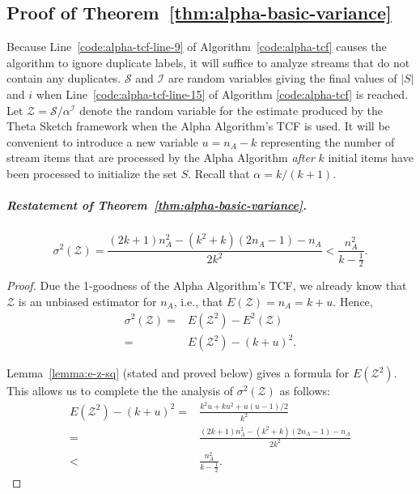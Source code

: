 \documentclass{article}
\begin{document}
\subsection{Proof of Theorem~\ref{thm:alpha-basic-variance}}\label{appendix-proof-of-alpha-basic-variance}



 Because Line~\ref{code:alpha-tcf-line-9} 
of Algorithm~\ref{code:alpha-tcf} causes the algorithm to ignore duplicate labels,
it will suffice to analyze streams that do not contain any duplicates.
$\mathcal{S}$ and $\mathcal{I}$ are random variables giving
the final values of $|S|$ and $i$ when Line~\ref{code:alpha-tcf-line-15} of Algorithm
\ref{code:alpha-tcf} is
reached. Let $\mathcal{Z} = \mathcal{S} / \alpha^{\mathcal{I}}$ denote the
random variable for the estimate produced by the Theta Sketch
framework when the Alpha Algorithm's TCF is used. 
It will be convenient to introduce a new variable $u = n_A - k$
representing the number of stream items that are processed by the 
Alpha Algorithm {\em after} $k$ initial items have been processed to
initialize the set $S$.  Recall that $\alpha = k/(k+1)$. 










\subparagraph*{Restatement of Theorem~\ref{thm:alpha-basic-variance}.}
\[
\sigma^2(\mathcal{Z}) = \frac{(2k+1)n_A^2 - (k^2+k)(2n_A-1)- n_A}{2k^2} < \frac{n_A^2}{k - \frac{1}{2}}.
\]
\begin{proof}
Due the 1-goodness of the Alpha Algorithm's TCF, we already 
know that $\mathcal{Z}$ is an unbiased estimator for $n_A$, i.e., that $E(\mathcal{Z}) = n_A = k+u$. Hence,
\begin{align*}
\sigma^2(\mathcal{Z}) 
= & E(\mathcal{Z}^2) - E^2(\mathcal{Z}) \\
= & E(\mathcal{Z}^2) - (k+u)^2.
\end{align*}

Lemma~\ref{lemma:e-z-sq} (stated and proved below) gives a formula for $E(\mathcal{Z}^2)$. This allows us to complete the 
the analysis of $\sigma^2(\mathcal{Z})$ as follows:
\begin{align*}
             E(\mathcal{Z}^2) - (k+u)^2         = & \frac{k^2u + ku^2 + u(u\!-\!1)/2}{k^2} \\
                                = & \frac{(2k+1)n_A^2 - (k^2+k)(2n_A-1)- n_A}{2k^2} \\
                                          < & \frac{n_A^2}{k - \frac{1}{2}}.
\end{align*}
\end{proof}
\end{document}

